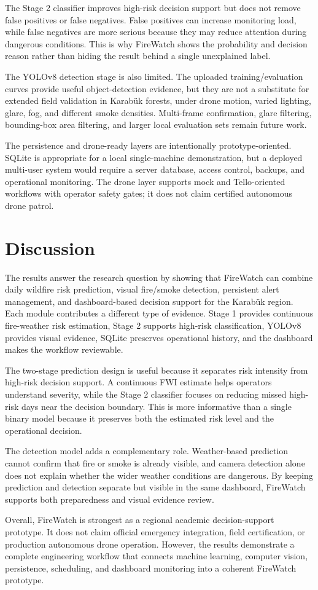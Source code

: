 The Stage 2 classifier improves high-risk decision support but does not remove
false positives or false negatives. False positives can increase monitoring
load, while false negatives are more serious because they may reduce attention
during dangerous conditions. This is why FireWatch shows the probability and
decision reason rather than hiding the result behind a single unexplained
label.

The YOLOv8 detection stage is also limited. The uploaded training/evaluation
curves provide useful object-detection evidence, but they are not a substitute
for extended field validation in Karabük forests, under drone motion, varied
lighting, glare, fog, and different smoke densities. Multi-frame confirmation,
glare filtering, bounding-box area filtering, and larger local evaluation
sets remain future work.

The persistence and drone-ready layers are intentionally prototype-oriented.
SQLite is appropriate for a local single-machine demonstration, but a deployed
multi-user system would require a server database, access control, backups,
and operational monitoring. The drone layer supports mock and Tello-oriented
workflows with operator safety gates; it does not claim certified autonomous
drone patrol.

\section{Discussion}

The results answer the research question by showing that FireWatch can combine
daily wildfire risk prediction, visual fire/smoke detection, persistent alert
management, and dashboard-based decision support for the Karabük region. Each
module contributes a different type of evidence. Stage 1 provides continuous
fire-weather risk estimation, Stage 2 supports high-risk classification,
YOLOv8 provides visual evidence, SQLite preserves operational history, and the
dashboard makes the workflow reviewable.

The two-stage prediction design is useful because it separates risk intensity
from high-risk decision support. A continuous FWI estimate helps operators
understand severity, while the Stage 2 classifier focuses on reducing missed
high-risk days near the decision boundary. This is more informative than a
single binary model because it preserves both the estimated risk level and the
operational decision.

The detection model adds a complementary role. Weather-based prediction cannot
confirm that fire or smoke is already visible, and camera detection alone does
not explain whether the wider weather conditions are dangerous. By keeping
prediction and detection separate but visible in the same dashboard, FireWatch
supports both preparedness and visual evidence review.

Overall, FireWatch is strongest as a regional academic decision-support
prototype. It does not claim official emergency integration, field
certification, or production autonomous drone operation. However, the results
demonstrate a complete engineering workflow that connects machine learning,
computer vision, persistence, scheduling, and dashboard monitoring into a
coherent FireWatch prototype.
